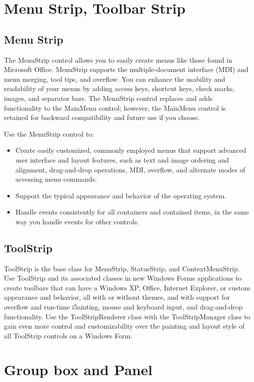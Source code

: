 \section{Menu Strip, Toolbar Strip}
\subsection{Menu Strip}
The MenuStrip control allows you to easily create menus like those found in Microsoft Office.
MenuStrip supports the multiple-document interface (MDI) and menu merging, tool tips, and
overflow. You can enhance the usability and readability of your menus by adding access keys,
shortcut keys, check marks, images, and separator bars. The MenuStrip control replaces and adds
functionality to the MainMenu control; however, the MainMenu control is retained for backward
compatibility and future use if you choose.

Use the MenuStrip control to:

\begin{itemize}
	\item Create easily customized, commonly employed menus that support advanced user interface
	and layout features, such as text and image ordering and alignment, drag-and-drop
	operations, MDI, overflow, and alternate modes of accessing menu commands.
	\item Support the typical appearance and behavior of the operating system.
	\item Handle events consistently for all containers and contained items, in the same way you
	handle events for other controls.
\end{itemize}

\subsection{ToolStrip}
ToolStrip is the base class for MenuStrip, StatusStrip, and ContextMenuStrip.
Use ToolStrip and its associated classes in new Windows Forms applications to create toolbars that
can have a Windows XP, Office, Internet Explorer, or custom appearance and behavior, all with or
without themes, and with support for overflow and run-time i5ainting, mouse and keyboard input,
and drag-and-drop functionality. Use the ToolStripRenderer class with the ToolStripManager class
to gain even more control and customizability over the painting and layout style of all ToolStrip
controls on a Windows Form.

\section{Group box and Panel}
